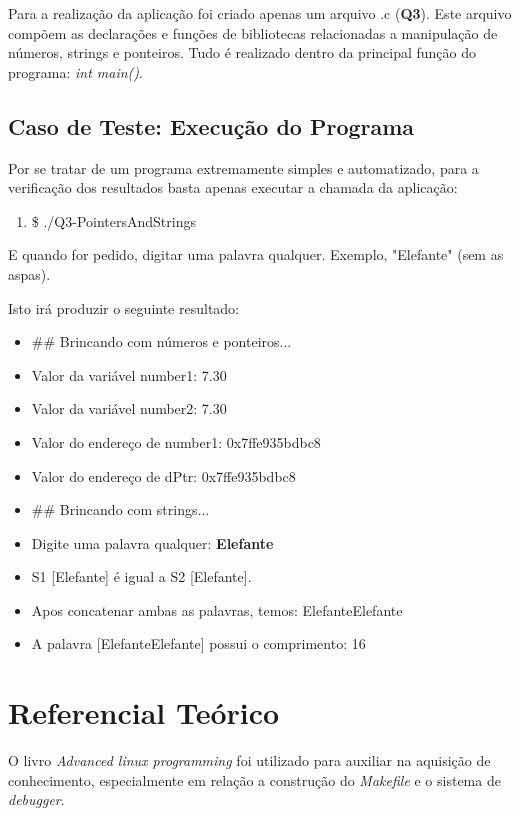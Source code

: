   Para a realização da aplicação foi criado apenas um arquivo .c (\textbf{Q3}). Este arquivo compõem as declarações e
  funções de bibliotecas relacionadas a manipulação de números, strings e ponteiros. Tudo é realizado dentro da
  principal função do programa: \textit{int main()}.

  \subsection{Caso de Teste: Execução do Programa}

	  Por se tratar de um programa extremamente simples e automatizado, para a verificação dos resultados basta apenas
	  executar a chamada da aplicação:

	  \begin{enumerate}
	    \item \$ ./Q3-PointersAndStrings
	  \end{enumerate}

	  E quando for pedido, digitar uma palavra qualquer. Exemplo, "Elefante" (sem as aspas).

	  Isto irá produzir o seguinte resultado:

	  \begin{itemize}
	    \item \#\# Brincando com números e ponteiros...
	    \item Valor da variável number1: 7.30
	    \item Valor da variável number2: 7.30

	    \item Valor do endereço de number1: 0x7ffe935bdbc8
	    \item Valor do endereço de dPtr: 0x7ffe935bdbc8

	    \item \#\# Brincando com strings...
	    \item Digite uma palavra qualquer: \textbf{Elefante}

	    \item S1 [Elefante] é igual a S2 [Elefante].
	    \item Apos concatenar ambas as palavras, temos: ElefanteElefante
	    \item A palavra [ElefanteElefante] possui o comprimento: 16
	  \end{itemize}


\section[Referencial Teórico]{Referencial Teórico}

  O livro \textit{Advanced linux programming} \cite{advancedlinux} foi utilizado para auxiliar na aquisição de conhecimento, especialmente em relação a construção do \textit{Makefile} e o sistema de \textit{debugger}.
